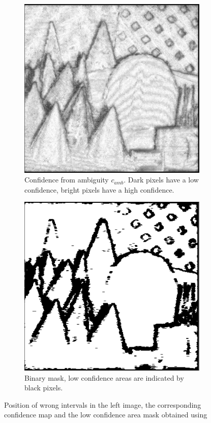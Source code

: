 \begin{figure}
\begin{subfigure}[t]{0.3\linewidth}
        \includegraphics[width=\linewidth]{Images/Chap_5/ambiguity_cones.png}
        \caption{Confidence from ambiguity $c_{amb}$. Dark pixels have a low confidence, bright pixels have a high confidence.}
        \label{fig:ambiguity_cones}
    \end{subfigure}\hfill
    \begin{subfigure}[t]{0.3\linewidth}
        \centering
        \includegraphics[width=\linewidth]{Images/Chap_5/ambiguity_mask_cones.png}
        \caption{Binary mask, low confidence areas are indicated by black pixels.}
        \label{fig:ambiguity_mask_cones}
    \end{subfigure}
    \caption{Position of wrong intervals in the left image, the corresponding confidence map and the low confidence area mask obtained using }
    \label{fig:wrong_intervals_and_ambiguity}
\end{figure}

